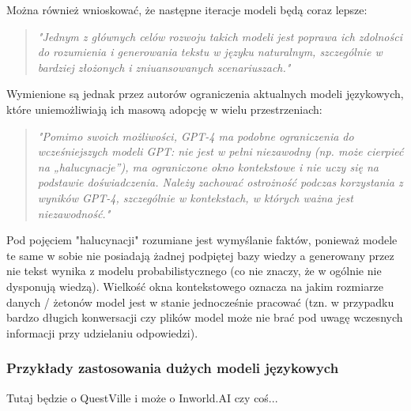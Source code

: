 Można również wnioskować, że następne iteracje modeli będą coraz lepsze:

\begin{quote}
    \textit{"Jednym z głównych celów rozwoju takich modeli jest poprawa ich zdolności do rozumienia i
        generowania tekstu w języku naturalnym, szczególnie w bardziej złożonych i zniuansowanych
        scenariuszach."}\cite{openai2024gpt4}
\end{quote}

Wymienione są jednak przez autorów ograniczenia aktualnych modeli językowych, które uniemożliwiają ich
masową adopcję w wielu przestrzeniach:

\begin{quote}
    \textit{"Pomimo swoich możliwości, GPT-4 ma podobne ograniczenia do wcześniejszych modeli GPT: nie jest w
        pełni niezawodny (np. może cierpieć na „halucynacje”), ma ograniczone okno kontekstowe i nie uczy
        się na podstawie doświadczenia. Należy zachować ostrożność podczas korzystania z wyników GPT-4,
        szczególnie w kontekstach, w których ważna jest niezawodność."}\cite{openai2024gpt4}
\end{quote}

Pod pojęciem "halucynacji" rozumiane jest wymyślanie faktów, ponieważ modele te same w sobie nie posiadają
żadnej podpiętej bazy wiedzy a generowany przez nie tekst wynika z modelu probabilistycznego (co nie
znaczy, że w ogólnie nie dysponują wiedzą). Wielkość okna kontekstowego oznacza na jakim rozmiarze
danych / żetonów model jest w stanie jednocześnie pracować (tzn. w przypadku bardzo długich konwersacji
czy plików model może nie brać pod uwagę wczesnych informacji przy udzielaniu odpowiedzi).

\subsubsection*{Przykłady zastosowania dużych modeli językowych}

Tutaj będzie o QuestVille i może o Inworld.AI czy coś...